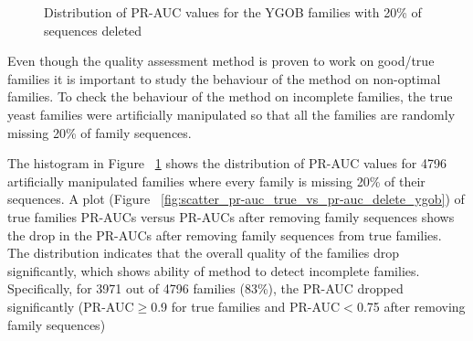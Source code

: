 \documentclass{article}
\begin{document}
		\begin{figure}
			\caption{Distribution of PR-AUC values for the YGOB families with 20\% of sequences deleted}
			\label{fig:hist_pr-auc_delete_ygob}
		\end{figure}
		
		Even though the quality assessment method is proven to work on good/true families it is important to study the behaviour of the method on non-optimal families. To check the behaviour of the method on incomplete families, the true yeast families were artificially manipulated so that all the families are randomly missing 20\% of family sequences.
		
		The histogram in Figure ~\ref{fig:hist_pr-auc_delete_ygob} shows the distribution of PR-AUC values for 4796 artificially manipulated families where every family is missing 20\% of their sequences. A plot (Figure ~\ref{fig:scatter_pr-auc_true_vs_pr-auc_delete_ygob}) of true families PR-AUCs versus PR-AUCs after removing family sequences shows the drop in the PR-AUCs after removing family sequences from true families. The distribution indicates that the overall quality of the families drop significantly, which shows ability of method to detect incomplete families. Specifically, for 3971 out of 4796 families (83\%), the PR-AUC dropped significantly (PR-AUC$\geq$0.9 for true families and PR-AUC$<$0.75 after removing family sequences)
		
\end{document}

